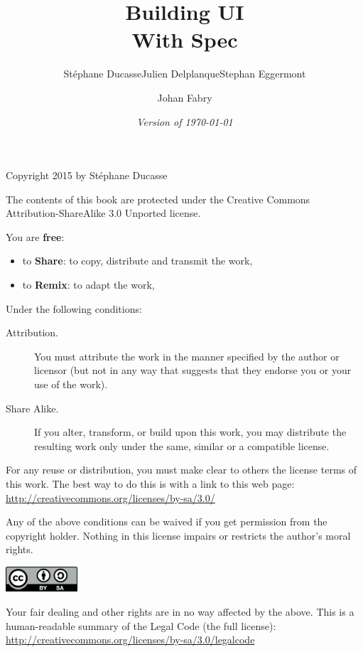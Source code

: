 \documentclass[a4paper,10pt,twoside]{book}
\begin{document}
\frontmatter
\setcounter{page}{1}
\pagestyle{headings}
\author{
	St\'ephane Ducasse\quad Julien Delplanque\quad Stephan Eggermont \and Johan Fabry
	}
\title{\Huge\bf Building UI  \\ With Spec}
\isodate
\date{\emph{Version of \today}}

\date{}
\maketitle


{\small

  Copyright 2015 by St\'ephane Ducasse

  The contents of this book are protected under the Creative Commons
  Attribution-ShareAlike 3.0 Unported license.

  You are \textbf{free}:
  \begin{itemize}
  \item to \textbf{Share}: to copy, distribute and transmit the work,
  \item to \textbf{Remix}: to adapt the work,
  \end{itemize}

  Under the following conditions:
  \begin{description}
  \item[Attribution.] You must attribute the work in the manner specified by the
    author or licensor (but not in any way that suggests that they endorse you
    or your use of the work).
  \item[Share Alike.] If you alter, transform, or build upon this work, you may
    distribute the resulting work only under the same, similar or a compatible
    license.
  \end{description}

  For any reuse or distribution, you must make clear to others the
  license terms of this work. The best way to do this is with a link to
  this web page: \\
  \url{http://creativecommons.org/licenses/by-sa/3.0/}

  Any of the above conditions can be waived if you get permission from
  the copyright holder. Nothing in this license impairs or restricts the
  author's moral rights.

  \begin{center}
    \includegraphics[width=0.2\textwidth]{support/latex/CreativeCommons-BY-SA.pdf}
  \end{center}

  Your fair dealing and other rights are in no way affected by the
  above. This is a human-readable summary of the Legal Code (the full
  license): \\
  \url{http://creativecommons.org/licenses/by-sa/3.0/legalcode}

  \vfill

}
\end{document}
